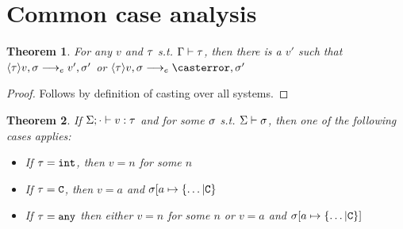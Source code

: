 \documentclass{report}
\newtheorem{thm}{Theorem}
\begin{document}
\section{Common case analysis}
\begin{thm} 
\label{castv}For any $v$ and $\tau$ s.t. $\Gamma\vdash \tau$, then there is a $v'$ such that $\langle \tau\rangle v,\sigma \longrightarrow_{e} v',\sigma'$ or $\cast{\t}v,\s \ereduce \casterror,\s'$\end{thm}
\begin{proof}
Follows by definition of casting over all systems.
\end{proof}

\begin{thm}
\label{canonforms}If $\Sigma;\cdot \vdash v : \tau$ and for some $\sigma$ s.t. $\Sigma \vdash \sigma$, then one of the following cases applies:
\begin{itemize}
\item If $\tau = \texttt{int}$, then $v = n$ for some $n$
\item If $\tau = \texttt{C}$, then $v = a$ and $\sigma[a \mapsto \{\ldots | \texttt{C} \}$
\item If $\tau = \texttt{any}$ then either $v = n$ for some $n$ or $v = a$ and $\sigma[a \mapsto \{\ldots | \texttt{C} \}]$
\end{itemize}
\end{thm}
\end{document}
